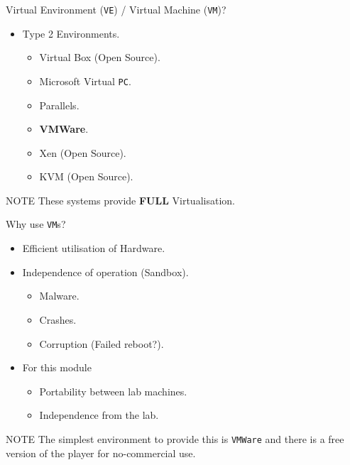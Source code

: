 \documentclass[aspectratio=169]{beamer}
\begin{document}
\begin{frame}{Virtual Environment (\texttt{VE}) / Virtual Machine (\texttt{VM})?}
  \begin{itemize}
    \item Type 2 Environments.
      \begin{itemize}
        \item Virtual Box (Open Source).
        \item Microsoft Virtual \texttt{PC}.
        \item Parallels.
        \item \textbf{VMWare}.
        \item Xen (Open Source).
        \item KVM (Open Source).
      \end{itemize}  
  \end{itemize}
  \begin{block}{NOTE}
    These systems provide \textbf{FULL} Virtualisation.
  \end{block}
\end{frame}

\begin{frame}{Why use \texttt{VM}s?}
  \begin{itemize}
    \item Efficient utilisation of Hardware.
    \item Independence of operation (Sandbox).
      \begin{itemize}
        \item Malware.
        \item Crashes.
        \item Corruption (Failed reboot?).
      \end{itemize}  
    \item For this module
      \begin{itemize}
        \item Portability between lab machines.
        \item Independence from the lab.
      \end{itemize}  
  \end{itemize}  
  \begin{block}{NOTE}
    The simplest environment to provide this is \texttt{VMWare} and there is a free version of the player for no-commercial use.
  \end{block}
\end{frame}
\end{document}
